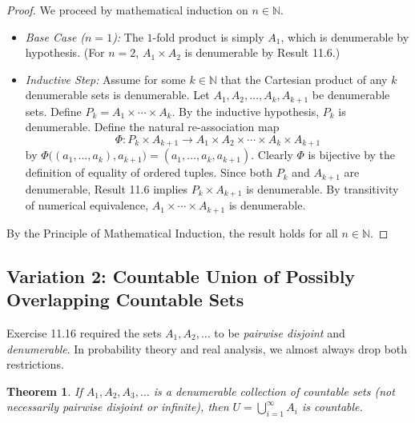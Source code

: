 \documentclass[11pt, letterpaper]{article}
\newtheorem{theorem}{Theorem}[section]
\theoremstyle{definition}
\theoremstyle{remark}
\begin{document}
\begin{proof}
We proceed by mathematical induction on $n \in \mathbb{N}$.
\begin{itemize}
    \item \emph{Base Case ($n = 1$):} The $1$-fold product is simply $A_1$, which is denumerable by hypothesis. (For $n = 2$, $A_1 \times A_2$ is denumerable by Result 11.6.)
    \item \emph{Inductive Step:} Assume for some $k \in \mathbb{N}$ that the Cartesian product of any $k$ denumerable sets is denumerable. Let $A_1, A_2, \dots, A_k, A_{k+1}$ be denumerable sets. Define $P_k = A_1 \times \cdots \times A_k$. By the inductive hypothesis, $P_k$ is denumerable. Define the natural re-association map
    \[
    \Phi : P_k \times A_{k+1} \to A_1 \times A_2 \times \cdots \times A_k \times A_{k+1}
    \]
    by $\Phi\bigl((a_1, \dots, a_k), a_{k+1}\bigr) = (a_1, \dots, a_k, a_{k+1})$. Clearly $\Phi$ is bijective by the definition of equality of ordered tuples. Since both $P_k$ and $A_{k+1}$ are denumerable, Result 11.6 implies $P_k \times A_{k+1}$ is denumerable. By transitivity of numerical equivalence, $A_1 \times \cdots \times A_{k+1}$ is denumerable.
\end{itemize}
By the Principle of Mathematical Induction, the result holds for all $n \in \mathbb{N}$.
\end{proof}

\subsection{Variation 2: Countable Union of Possibly Overlapping Countable Sets}

Exercise 11.16 required the sets $A_1, A_2, \dots$ to be \emph{pairwise disjoint} and \emph{denumerable}. In probability theory and real analysis, we almost always drop both restrictions.

\begin{theorem}
If $A_1, A_2, A_3, \dots$ is a denumerable collection of countable sets (not necessarily pairwise disjoint or infinite), then $U = \bigcup_{i=1}^{\infty} A_i$ is countable.
\end{theorem}
\end{document}
